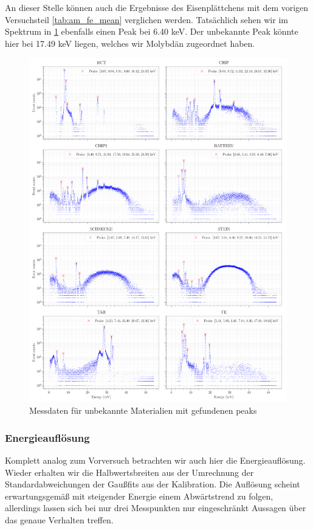 \documentclass[a4paper,14pt]{article}
\begin{document}
An dieser Stelle können auch die Ergebnisse des Eisenplättchens mit dem vorigen Versuchsteil \cref{tab:am_fe_mean} verglichen werden. Tatsächlich sehen wir im Spektrum in \cref{XRay_analysis} ebenfalls einen Peak bei 6.40 keV. Der unbekannte Peak könnte hier bei 17.49 keV liegen, welches wir Molybdän zugeordnet haben.

\begin{figure}[H]
\centering
\includegraphics[width=\textwidth]{../Figures/XRay-analysis.pdf}
\caption{Messdaten für unbekannte Materialien mit gefundenen peaks}
\label{XRay_analysis}
\end{figure}

\subsubsection{Energieauflösung}
Komplett analog zum Vorversuch betrachten wir auch hier die Energieauflösung. Wieder erhalten wir die Halbwertsbreiten aus der Umrechnung der Standardabweichungen der Gaußfits aus der Kalibration. Die Auflösung scheint erwartungsgemäß mit steigender Energie einem Abwärtstrend zu folgen, allerdings lassen sich bei nur drei Messpunkten nur eingeschränkt Aussagen über das genaue Verhalten treffen.
\end{document}
